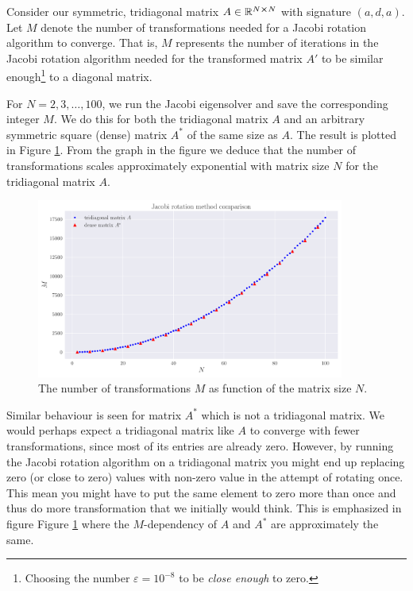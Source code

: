 \documentclass[english,notitlepage,nofootinbib]{revtex4-1}  %
\begin{document}
Consider our symmetric, tridiagonal matrix $A \in \mathbb{R}^{N\cross N}$ with signature $(a,d,a)$. Let $M$ denote the number of transformations needed for a Jacobi rotation algorithm to converge. That is, $M$ represents the number of iterations in the Jacobi rotation algorithm needed for the transformed matrix $A'$ to be similar enough\footnote{Choosing the number $\varepsilon=10^{-8}$ to be \textit{close enough} to zero.} to a diagonal matrix.

For $N=2,3,\dots,100$, we run the Jacobi eigensolver and save the corresponding integer $M$. We do this for both the tridiagonal matrix $A$ and an arbitrary symmetric square (dense) matrix $A^*$ of the same size as $A$. The result is plotted in Figure \ref{fig:p5_transformations_per_N}. From the graph in the figure we deduce that the number of transformations scales approximately exponential with matrix size $N$ for the tridiagonal matrix $A$. 


\begin{figure}[h!]
    \centering
    \includegraphics[width=0.9\textwidth]{jacobi_comparison.pdf}
    \caption{The number of transformations $M$ as function of the matrix size $N$.}\label{fig:p5_transformations_per_N}
\end{figure}

Similar behaviour is seen for matrix $A^*$ which is not a tridiagonal matrix. We would perhaps expect a tridiagonal matrix like $A$ to converge with fewer transformations, since most of its entries are already zero. However, by running the Jacobi rotation algorithm on a tridiagonal matrix you might end up replacing zero (or close to zero) values with non-zero value in the attempt of rotating once. This mean you might have to put the same element to zero more than once and thus do more transformation that we initially would think. This is emphasized in figure Figure \ref{fig:p5_transformations_per_N} where the $M$-dependency of $A$ and $A^*$ are approximately the same.   
\end{document}
